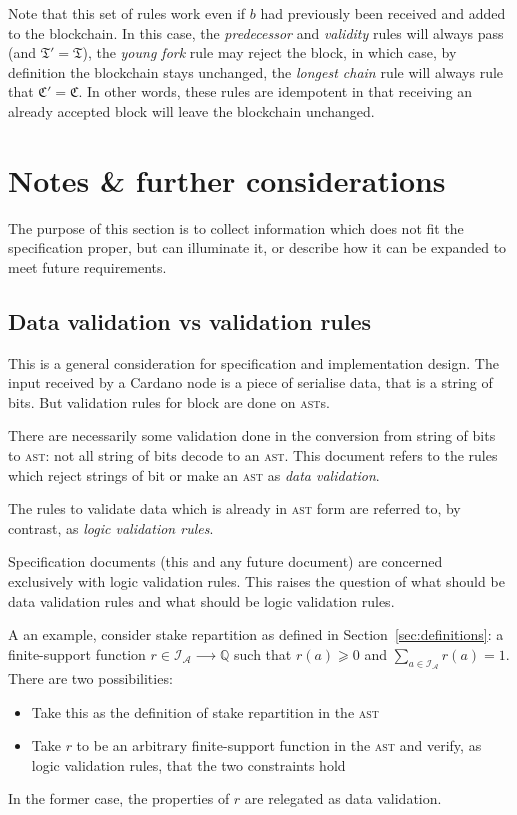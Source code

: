 \documentclass{article}
\newcommand{\idsof}[1]{\mathcal{I}\!_#1}
\newcommand{\agentids}{\idsof{\mathcal{A}}}
\begin{document}
Note that this set of rules work even if $b$ had previously been
received and added to the blockchain. In this case, the
\emph{predecessor} and \emph{validity} rules will always pass (and
$\mathfrak{T}'=\mathfrak{T}$), the \emph{young fork} rule may reject
the block, in which case, by definition the blockchain stays
unchanged, the \emph{longest chain} rule will always rule that
$\mathfrak{C'}=\mathfrak{C}$. In other words, these rules are
idempotent in that receiving an already accepted block will leave the
blockchain unchanged.

\appendix

\section{Notes \& further considerations}
\label{sec:notes}

The purpose of this section is to collect information which does not
fit the specification proper, but can illuminate it, or describe how
it can be expanded to meet future requirements.

\subsection{Data validation vs validation rules}
\label{sec:data-validation-vs}

This is a general consideration for specification and implementation
design. The input received by a Cardano node is a piece of serialise
data, that is a string of bits. But validation rules for block are
done on \textsc{ast}s.

There are necessarily some validation done in the conversion from
string of bits to \textsc{ast}: not all string of bits decode to an
\textsc{ast}. This document refers to the rules which reject strings
of bit or make an \textsc{ast} as \emph{data validation}.

The rules to validate data which is already in \textsc{ast} form are
referred to, by contrast, as \emph{logic validation rules}.

Specification documents (this and any future document) are concerned
exclusively with logic validation rules. This raises the
question of what should be data validation rules and what should be
logic validation rules.

A an example, consider stake repartition as defined in
Section~\ref{sec:definitions}: a finite-support function $r∈\agentids
⟶ \mathbb{Q}$ such that $r(a) ⩾ 0$ and $∑_{a∈\agentids} r(a) =
1$. There are two possibilities:
\begin{itemize}
\item Take this as the definition of stake repartition in the
  \textsc{ast}
\item Take $r$ to be an arbitrary finite-support function in the
  \textsc{ast} and verify, as logic validation rules, that the two
  constraints hold
\end{itemize}
In the former case, the properties of $r$ are relegated as data
validation.
\end{document}
